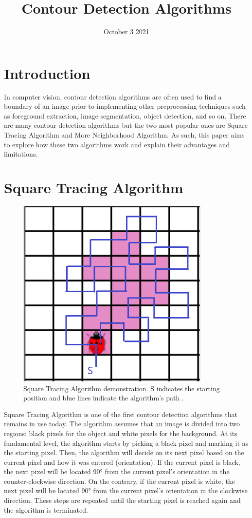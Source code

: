 \documentclass[conference]{IEEEtran}
\title{Contour Detection Algorithms}
\author{
    \IEEEauthorblockN{Sotheanith Sok}
    \IEEEauthorblockA{
        Department of Engineering\\ 
        California State University of Long Beach\\
        Sotheanith.Sok@student.csulb.edu
    }
}
\date{October 3 2021}
\begin{document}
\maketitle

\section{Introduction}
In computer vision, contour detection algorithms are often used to find a boundary of an image prior to implementing other preprocessing techniques such as foreground extraction, image segmentation, object detection, and so on. There are many contour detection algorithms but the two most popular ones are Square Tracing Algorithm and More Neighborhood Algorithm. As such, this paper aims to explore how these two algorithms work and explain their advantages and limitations.

\section{Square Tracing Algorithm}

\begin{figure}[!htb]
    \centering
    \includegraphics[scale = 0.5]{fig1.png}
    \caption{Square Tracing Algorithm demonstration. S indicates the starting position and blue lines indicate the algorithm's path \cite{sta:2000}.}
\end{figure}

Square Tracing Algorithm is one of the first contour detection algorithms that remains in use today. The algorithm assumes that an image is divided into two regions: black pixels for the object and white pixels for the background. At its fundamental level, the algorithm starts by picking a black pixel and marking it as the starting pixel. Then, the algorithm will decide on its next pixel based on the current pixel and how it was entered (orientation). If the current pixel is black, the next pixel will be located 90° from the current pixel's orientation in the counter-clockwise direction. On the contrary, if the current pixel is white, the next pixel will be located 90° from the current pixel's orientation in the clockwise direction. These steps are repeated until the starting pixel is reached again and the algorithm is terminated.
\end{document}

